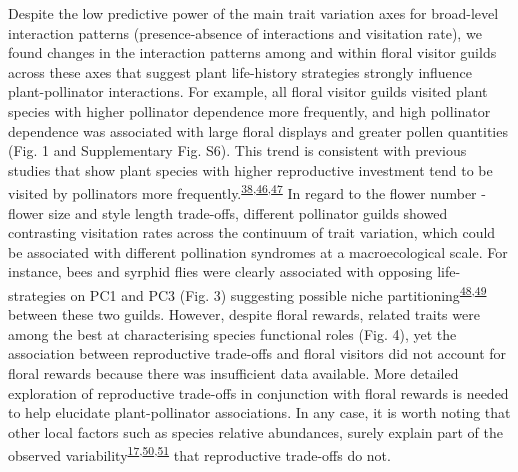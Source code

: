\documentclass[
  12pt,
  a4paper,
]{article}
\begin{document}
Despite the low predictive power of the main trait variation axes for broad-level interaction patterns (presence-absence of interactions and visitation rate), we found changes in the interaction patterns among and within floral visitor guilds across these axes that suggest plant life-history strategies strongly influence plant-pollinator interactions. For example, all floral visitor guilds visited plant species with higher pollinator dependence more frequently, and high pollinator dependence was associated with large floral displays and greater pollen quantities (Fig. 1 and Supplementary Fig. S6). This trend is consistent with previous studies that show plant species with higher reproductive investment tend to be visited by pollinators more frequently.\textsuperscript{\protect\hyperlink{ref-lazaro2013}{38},\protect\hyperlink{ref-hegland2005}{46},\protect\hyperlink{ref-kaiser2014}{47}} In regard to the flower number - flower size and style length trade-offs, different pollinator guilds showed contrasting visitation rates across the continuum of trait variation, which could be associated with different pollination syndromes at a macroecological scale. For instance, bees and syrphid flies were clearly associated with opposing life-strategies on PC1 and PC3 (Fig. 3) suggesting possible niche partitioning\textsuperscript{\protect\hyperlink{ref-palmer2003}{48},\protect\hyperlink{ref-phillips2020}{49}} between these two guilds. However, despite floral rewards, related traits were among the best at characterising species functional roles (Fig. 4), yet the association between reproductive trade-offs and floral visitors did not account for floral rewards because there was insufficient data available. More detailed exploration of reproductive trade-offs in conjunction with floral rewards is needed to help elucidate plant-pollinator associations. In any case, it is worth noting that other local factors such as species relative abundances, surely explain part of the observed variability\textsuperscript{\protect\hyperlink{ref-bartomeus2016}{17},\protect\hyperlink{ref-vazquez2007}{50},\protect\hyperlink{ref-encinas2012}{51}} that reproductive trade-offs do not.
\end{document}
